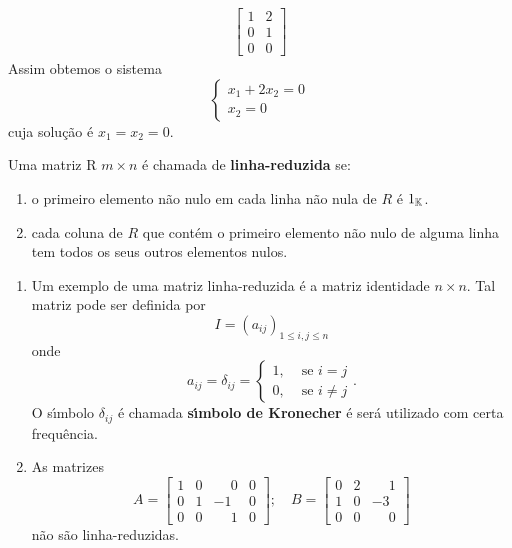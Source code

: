 \begin{exemplo}
\begin{enumerate}[label={\arabic*})]
\begin{align*}
				\left[
					\begin{array}{cc}
						1 & 2\\
						0 & 1\\
						0 & 0
					\end{array}
				\right]
		\end{align*}
		Assim obtemos o sistema
		\[
			\begin{cases}
				x_1 + 2x_2 = 0\\
				x_2 = 0
			\end{cases}
		\]
		cuja solu\c{c}\~ao \'e $x_1 = x_2 = 0$.
	\end{enumerate}
\end{exemplo}

\begin{definicao}\label{linhareduzida}
	Uma matriz R $m \times n$ \'e chamada de \textbf{linha-reduzida} se:
	\begin{enumerate}[label={\roman*})]
		\item o primeiro elemento n\~ao nulo em cada linha n\~ao nula de $R$ \'e $1_{\mathbb{K}}$.
		\item cada coluna de $R$ que cont\'em o primeiro elemento n\~ao nulo de alguma linha tem todos os seus outros elementos nulos.
	\end{enumerate}
\end{definicao}

\begin{exemplo}
	\begin{enumerate}[label={\arabic*})]
		\item Um exemplo de uma matriz linha-reduzida \'e a matriz identidade $n \times n$. Tal matriz pode ser definida por
		\[
			I = (a_{ij})_{1 \le i,j \le n}
		\]
		onde
		\[
			a_{ij} = \delta_{ij} =
			\begin{cases}
				1, & \mbox{ se } i = j\\
				0, & \mbox{ se } i \ne j 
			\end{cases}.
		\]
		O s{\'\i}mbolo $\delta_{ij}$ \'e chamada \textbf{s{\'\i}mbolo de Kronecher} \'e ser\'a utilizado com certa frequ\^encia.
		\item As matrizes
		\[
			A =
			\begin{bmatrix}
				1 & 0 & \phantom{-}0 & 0\\
				0 & 1 & -1 & 0\\
				0 & 0 & \phantom{-}1 & 0
			\end{bmatrix};\quad
			B =
			\begin{bmatrix}
				0 & 2 & \phantom{-}1\\
				1 & 0 & -3\\
				0 & 0 & \phantom{-}0
			\end{bmatrix}
		\]
		n\~ao s\~ao linha-reduzidas.
	\end{enumerate}
\end{exemplo}

